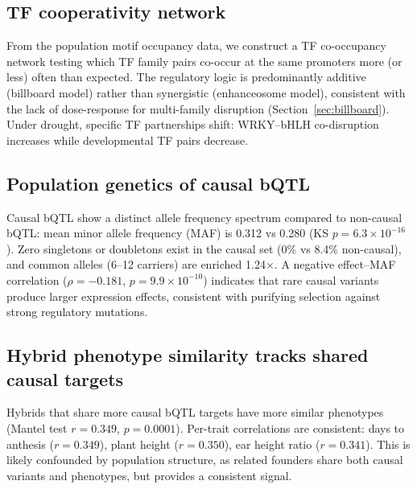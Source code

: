 \documentclass[11pt,a4paper]{article}
\begin{document}
\subsection{TF cooperativity network}
\label{sec:coop}

From the population motif occupancy data, we construct a TF co-occupancy
network testing which TF family pairs co-occur at the same promoters more
(or less) often than expected. The regulatory logic is predominantly
additive (billboard model) rather than synergistic (enhanceosome model),
consistent with the lack of dose-response for multi-family disruption
(Section~\ref{sec:billboard}). Under drought, specific TF partnerships
shift: WRKY--bHLH co-disruption increases while developmental TF pairs
decrease.


\subsection{Population genetics of causal bQTL}
\label{sec:popgen}

Causal bQTL show a distinct allele frequency spectrum compared to non-causal
bQTL: mean minor allele frequency (MAF) is 0.312 vs 0.280
(KS $p = 6.3 \times 10^{-16}$). Zero singletons or doubletons exist in
the causal set (0\% vs 8.4\% non-causal), and common alleles
(6--12 carriers) are enriched 1.24$\times$. A negative effect--MAF
correlation ($\rho = -0.181$, $p = 9.9 \times 10^{-10}$) indicates that
rare causal variants produce larger expression effects, consistent with
purifying selection against strong regulatory mutations.


\subsection{Hybrid phenotype similarity tracks shared causal targets}

Hybrids that share more causal bQTL targets have more similar phenotypes
(Mantel test $r = 0.349$, $p = 0.0001$). Per-trait correlations are
consistent: days to anthesis ($r = 0.349$), plant height ($r = 0.350$),
ear height ratio ($r = 0.341$). This is likely confounded by population
structure, as related founders share both causal variants and phenotypes,
but provides a consistent signal.
\end{document}
